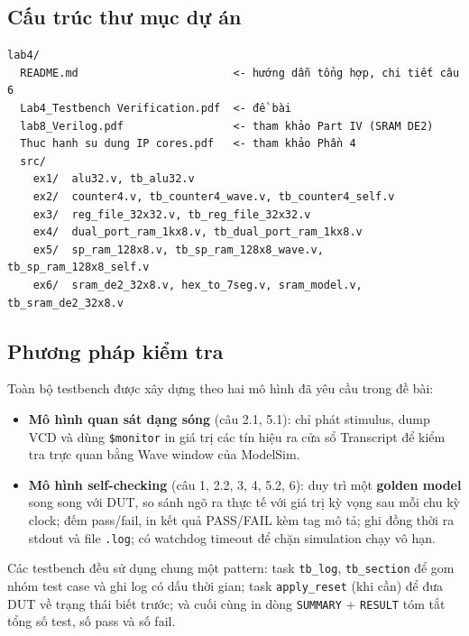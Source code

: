 \documentclass[12pt,a4paper]{article}
\begin{document}
\subsection{Cấu trúc thư mục dự án}

\begin{lstlisting}[style=md, caption={Tổ chức thư mục \texttt{lab4/src/}}]
lab4/
  README.md                        <- hướng dẫn tổng hợp, chi tiết câu 6
  Lab4_Testbench Verification.pdf  <- đề bài
  lab8_Verilog.pdf                 <- tham khảo Part IV (SRAM DE2)
  Thuc hanh su dung IP cores.pdf   <- tham khảo Phần 4
  src/
    ex1/  alu32.v, tb_alu32.v
    ex2/  counter4.v, tb_counter4_wave.v, tb_counter4_self.v
    ex3/  reg_file_32x32.v, tb_reg_file_32x32.v
    ex4/  dual_port_ram_1kx8.v, tb_dual_port_ram_1kx8.v
    ex5/  sp_ram_128x8.v, tb_sp_ram_128x8_wave.v, tb_sp_ram_128x8_self.v
    ex6/  sram_de2_32x8.v, hex_to_7seg.v, sram_model.v, tb_sram_de2_32x8.v
\end{lstlisting}

\subsection{Phương pháp kiểm tra}
Toàn bộ testbench được xây dựng theo hai mô hình đã yêu cầu trong đề bài:

\begin{itemize}[leftmargin=1.5cm]
    \item \textbf{Mô hình quan sát dạng sóng} (câu 2.1, 5.1): chỉ phát stimulus, dump VCD và dùng \texttt{\$monitor} in giá trị các tín hiệu ra cửa sổ Transcript để kiểm tra trực quan bằng Wave window của ModelSim.
    \item \textbf{Mô hình self-checking} (câu 1, 2.2, 3, 4, 5.2, 6): duy trì một \textbf{golden model} song song với DUT, so sánh ngõ ra thực tế với giá trị kỳ vọng sau mỗi chu kỳ clock; đếm pass/fail, in kết quả PASS/FAIL kèm tag mô tả; ghi đồng thời ra stdout và file \texttt{.log}; có watchdog timeout để chặn simulation chạy vô hạn.
\end{itemize}

Các testbench đều sử dụng chung một pattern: task \texttt{tb\_log}, \texttt{tb\_section} để gom nhóm test case và ghi log có dấu thời gian; task \texttt{apply\_reset} (khi cần) để đưa DUT về trạng thái biết trước; và cuối cùng in dòng \texttt{SUMMARY} + \texttt{RESULT} tóm tắt tổng số test, số pass và số fail.

\newpage

\end{document}
